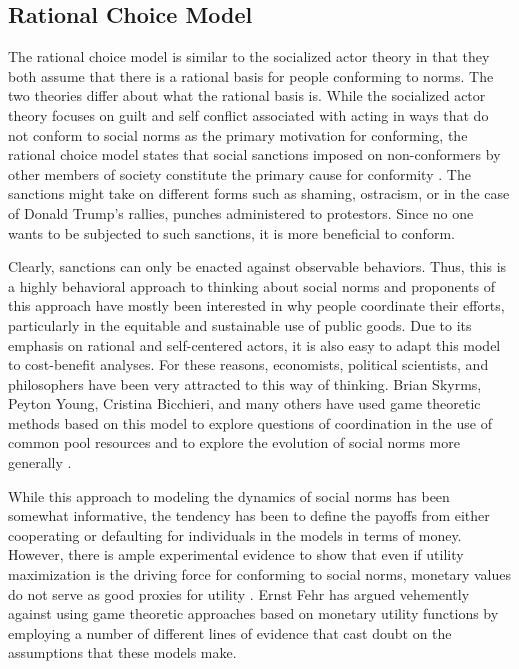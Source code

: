 \documentclass[rutwik_proposal.tex]{subfiles}
\begin{document}
\subsection{Rational Choice Model}\label{subsec:rationality}

The rational choice model is similar to the socialized actor theory in that they both assume that there is a rational basis for people conforming to norms. The two theories differ about what the rational basis is. While the socialized actor theory focuses on guilt and self conflict associated with acting in ways that do not conform to social norms as the primary motivation for conforming, the rational choice model states that social sanctions imposed on non-conformers by other members of society constitute the primary cause for conformity \cite{Axelrod86}. The sanctions might take on different forms such as shaming, ostracism, or in the case of Donald Trump's rallies, punches administered to protestors. Since no one wants to be subjected to such sanctions, it is more beneficial to conform.

Clearly, sanctions can only be enacted against observable behaviors. Thus, this is a highly behavioral approach to thinking about social norms and proponents of this approach have mostly been interested in why people coordinate their efforts, particularly in the equitable and sustainable use of public goods. Due to its emphasis on rational and self-centered actors, it is also easy to adapt this model to cost-benefit analyses. For these reasons, economists, political scientists, and philosophers have been very attracted to this way of thinking. Brian Skyrms, Peyton Young, Cristina Bicchieri, and many others have used game theoretic methods based on this model to explore questions of coordination in the use of common pool resources and to explore the evolution of social norms more generally \cite{Skyrms96, Skyrms04, Young1998}. 

While this approach to modeling the dynamics of social norms has been somewhat informative, the tendency has been to define the payoffs from either cooperating or defaulting for individuals in the models in terms of money. However, there is ample experimental evidence to show that even if utility maximization is the driving force for conforming to social norms, monetary values do not serve as good proxies for utility \cite{Fehr03}. Ernst Fehr has argued vehemently against using game theoretic approaches based on monetary utility functions by employing a number of different lines of evidence that cast doubt on the assumptions that these models make.
\end{document}
